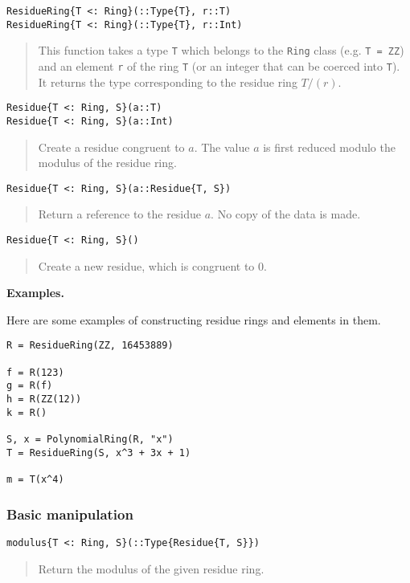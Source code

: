 \documentclass[a4paper,10pt]{article}
\newcommand{\code}{\lstinline}
\newcommand{\desc}[1]{\vspace{-3mm}\begin{quote}#1\end{quote}}
\begin{document}
{{{\begin{lstlisting}
ResidueRing{T <: Ring}(::Type{T}, r::T)
ResidueRing{T <: Ring}(::Type{T}, r::Int)
\end{lstlisting}

\desc{This function takes a type \code{T} which belongs to the \code{Ring}
class (e.g. \code{T = ZZ}) and an element \code{r} of the ring \code{T} (or
an integer that can be coerced into \code{T}). It returns the type 
corresponding to the residue ring $T/(r)$.}

\begin{lstlisting}
Residue{T <: Ring, S}(a::T)
Residue{T <: Ring, S}(a::Int)  
\end{lstlisting}

\desc{Create a residue congruent to $a$. The value $a$ is first reduced
modulo the modulus of the residue ring.}

\begin{lstlisting}
Residue{T <: Ring, S}(a::Residue{T, S})  
\end{lstlisting}

\desc{Return a reference to the residue $a$. No copy of the data is made.}

\begin{lstlisting}
Residue{T <: Ring, S}()
\end{lstlisting}

\desc{Create a new residue, which is congruent to $0$.}

\textbf{Examples.}

Here are some examples of constructing residue rings and elements in them.

\begin{lstlisting}
R = ResidueRing(ZZ, 16453889)

f = R(123)
g = R(f)
h = R(ZZ(12))
k = R()

S, x = PolynomialRing(R, "x")
T = ResidueRing(S, x^3 + 3x + 1)

m = T(x^4)
\end{lstlisting}

\subsubsection{Basic manipulation}

\begin{lstlisting}
modulus{T <: Ring, S}(::Type{Residue{T, S}})
\end{lstlisting}

\desc{Return the modulus of the given residue ring.}

}}}
\end{document}
